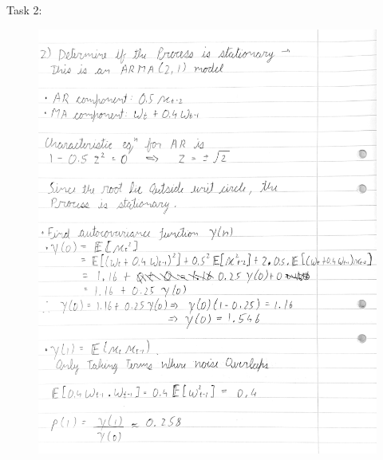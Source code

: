 \documentclass[a4paper,11pt]{article}
\begin{document}
    \newpage
    Task 2:    
    \begin{figure}[H]
        \centering
        \includegraphics[width=1\textwidth]{ha-1_files/2-1.png}
        \label{fig:2}
    \end{figure}
\end{document}
